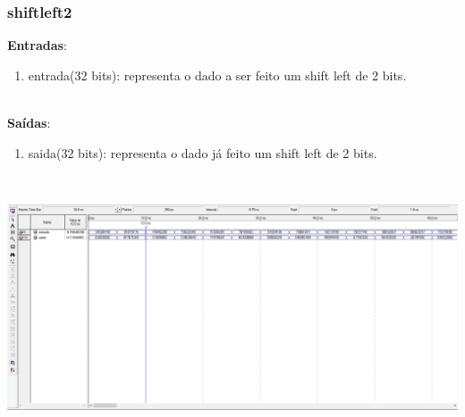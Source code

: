 \documentclass{article}
\begin{document}
    \subsubsection{shiftleft2}
    \textbf{Entradas}:
    \begin{enumerate}
        \item entrada(32 bits): representa o dado a ser feito um shift left de 2 bits.\\
    \end{enumerate}
    \\
    \textbf{Saídas}:
    \begin{enumerate}
        \item saida(32 bits): representa o dado já feito um shift left de 2 bits.\\
    \end{enumerate}\\
    \begin{center}
        \includegraphics[scale=0.4]{shiftleft2.PNG}
    \end{center}
    \newpage
\end{document}
